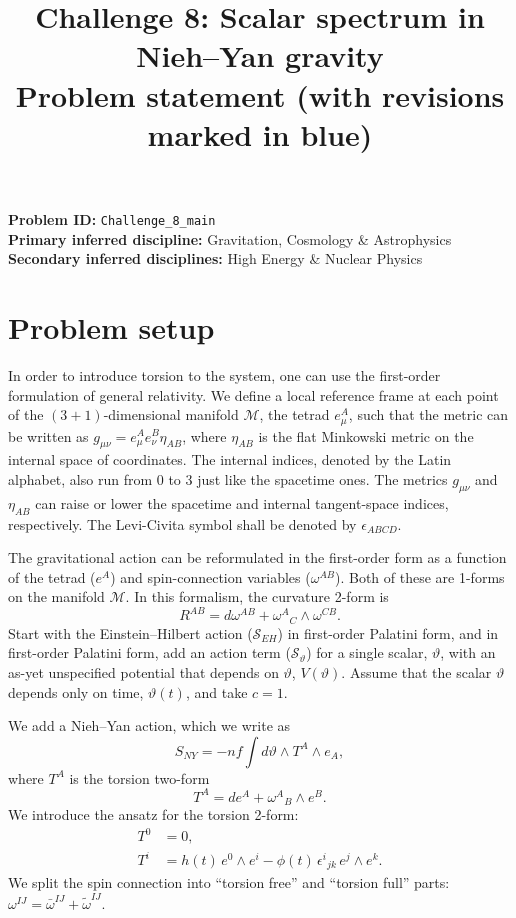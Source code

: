 \documentclass[11pt]{article}
\title{Challenge 8: Scalar spectrum in Nieh--Yan gravity \\ \large Problem statement (with revisions marked in blue)}
\date{}
\begin{document}
\maketitle
\noindent\textbf{Problem ID:} \texttt{Challenge\_8\_main}\\
\textbf{Primary inferred discipline:} Gravitation, Cosmology \& Astrophysics\\
\textbf{Secondary inferred disciplines:} High Energy \& Nuclear Physics

\section*{Problem setup}
In order to introduce torsion to the system, one can use the first-order formulation of general relativity. We define a local reference frame at each point of the $(3+1)$-dimensional manifold $\mathcal M$, the tetrad $e^A_\mu$, such that the metric can be written as $g_{\mu\nu}=e^A_\mu e^B_\nu\eta_{AB}$, where $\eta_{AB}$ is the flat Minkowski metric on the internal space of coordinates. The internal indices, denoted by the Latin alphabet, also run from 0 to 3 just like the spacetime ones. The metrics $g_{\mu\nu}$ and $\eta_{AB}$ can raise or lower the spacetime and internal tangent-space indices, respectively. The Levi-Civita symbol shall be denoted by $\epsilon_{ABCD}$.

The gravitational action can be reformulated in the first-order form as a function of the tetrad ($e^A$) and spin-connection variables ($\omega^{AB}$). Both of these are 1-forms on the manifold $\mathcal M$. In this formalism, the curvature 2-form is
\begin{equation}
R^{AB}=d\omega^{AB}+\omega^A{}_C\wedge\omega^{CB}.
\end{equation}
Start with the Einstein--Hilbert action ($\mathcal S_{EH}$) in first-order Palatini form, and in first-order Palatini form, add an action term ($\mathcal S_\vartheta$) for a single scalar, $\vartheta$, with an as-yet unspecified potential that depends on $\vartheta$, $V(\vartheta)$. Assume that the scalar $\vartheta$ depends only on time, $\vartheta(t)$, and take $c=1$.

We add a Nieh--Yan action, which we write as
\begin{equation}
S_{NY}=-nf\int d\vartheta\wedge T^A\wedge e_A,
\label{eq:NY}
\end{equation}
where $T^A$ is the torsion two-form
\begin{equation}
T^A=de^A+\omega^A{}_B\wedge e^B .
\end{equation}
We introduce the ansatz for the torsion 2-form:
\begin{align}
T^0&=0,\\
T^i&=h(t)\,e^0\wedge e^i-\phi(t)\,\epsilon^i{}_{jk}\,e^j\wedge e^k .
\label{eq:Ti}
\end{align}
We split the spin connection into ``torsion free'' and ``torsion full'' parts: $\omega^{IJ}=\bar\omega^{IJ}+\tilde\omega^{IJ}$.
\end{document}
